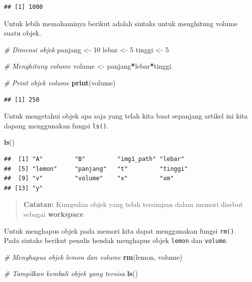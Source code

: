 \documentclass[
]{book}
\newenvironment{Shaded}{\begin{snugshade}}{\end{snugshade}}
\newcommand{\CommentTok}[1]{\textcolor[rgb]{0.56,0.35,0.01}{\textit{#1}}}
\newcommand{\DecValTok}[1]{\textcolor[rgb]{0.00,0.00,0.81}{#1}}
\newcommand{\FunctionTok}[1]{\textcolor[rgb]{0.13,0.29,0.53}{\textbf{#1}}}
\newcommand{\NormalTok}[1]{#1}
\newcommand{\OtherTok}[1]{\textcolor[rgb]{0.56,0.35,0.01}{#1}}
\newcommand{\SpecialCharTok}[1]{\textcolor[rgb]{0.81,0.36,0.00}{\textbf{#1}}}
\theoremstyle{definition}
\theoremstyle{definition}
\theoremstyle{definition}
\theoremstyle{definition}
\theoremstyle{remark}
\begin{document}
\begin{verbatim}
## [1] 1000
\end{verbatim}

Untuk lebih memahaminya berikut adalah sintaks untuk menghitung volume suatu objek.

\begin{Shaded}
\begin{Highlighting}[]
\CommentTok{\# Dimensi objek}
\NormalTok{panjang }\OtherTok{\textless{}{-}} \DecValTok{10}
\NormalTok{lebar }\OtherTok{\textless{}{-}} \DecValTok{5}
\NormalTok{tinggi }\OtherTok{\textless{}{-}} \DecValTok{5}

\CommentTok{\# Menghitung volume}
\NormalTok{volume }\OtherTok{\textless{}{-}}\NormalTok{ panjang}\SpecialCharTok{*}\NormalTok{lebar}\SpecialCharTok{*}\NormalTok{tinggi}

\CommentTok{\# Print objek volume}
\FunctionTok{print}\NormalTok{(volume)}
\end{Highlighting}
\end{Shaded}

\begin{verbatim}
## [1] 250
\end{verbatim}

Untuk mengetahui objek apa saja yang telah kita buat sepanjang artikel ini kita dapang menggunakan fungsi \texttt{ls()}.

\begin{Shaded}
\begin{Highlighting}[]
\FunctionTok{ls}\NormalTok{()}
\end{Highlighting}
\end{Shaded}

\begin{verbatim}
##  [1] "A"         "B"         "img1_path" "lebar"    
##  [5] "lemon"     "panjang"   "t"         "tinggi"   
##  [9] "v"         "volume"    "x"         "xm"       
## [13] "y"
\end{verbatim}

\begin{quote}
\textbf{Catatan:} Kumpulan objek yang telah tersimpan dalam memori disebut sebagai \textbf{workspace}
\end{quote}

Untuk menghapus objek pada memori kita dapat menggunakan fungsi \texttt{rm()}. Pada sintaks berikut penulis hendak menghapus objek \texttt{lemon} dan \texttt{volume}.

\begin{Shaded}
\begin{Highlighting}[]
\CommentTok{\# Menghapus objek lemon dan volume}
\FunctionTok{rm}\NormalTok{(lemon, volume)}

\CommentTok{\# Tampilkan kembali objek yang tersisa}
\FunctionTok{ls}\NormalTok{()}
\end{Highlighting}
\end{Shaded}
\end{document}
